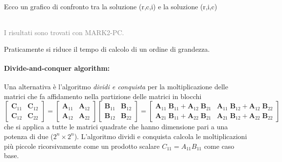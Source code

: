 \documentclass[10pt]{article}
\begin{document}
Ecco un grafico di confronto tra la soluzione (r,c,i) e la soluzione (r,i,c)

\\\textcolor{gray}{I risultati sono trovati con MARK2-PC.}

Praticamente si riduce il tempo di calcolo di un ordine di grandezza.






\paragraph{Divide-and-conquer algorithm:} Una alternativa è l'algoritmo \textit{dividi e conquista} per la moltiplicazione delle matrici che fa affidamento nella partizione delle matrici in blocchi
\begin{equation}
\begin{bmatrix}
\mathbf{C}_{11} & \mathbf{C}_{12} \\
\mathbf{C}_{12} & \mathbf{C}_{22}
\end{bmatrix} = 
\begin{bmatrix}
\mathbf{A}_{11} & \mathbf{A}_{12} \\
\mathbf{A}_{12} & \mathbf{A}_{22}
\end{bmatrix}
\begin{bmatrix}
\mathbf{B}_{11} & \mathbf{B}_{12} \\
\mathbf{B}_{12} & \mathbf{B}_{22}
\end{bmatrix} = 
\begin{bmatrix}
\mathbf{A}_{11}\;\mathbf{B}_{11}+\mathbf{A}_{12}\;\mathbf{B}_{21} & \mathbf{A}_{11}\;\mathbf{B}_{12}+\mathbf{A}_{12}\;\mathbf{B}_{22} \\
\mathbf{A}_{21}\;\mathbf{B}_{11}+\mathbf{A}_{22}\;\mathbf{B}_{21} & \mathbf{A}_{21}\;\mathbf{B}_{12}+\mathbf{A}_{22}\;\mathbf{B}_{22}
\end{bmatrix}
\end{equation}
che si applica a tutte le matrici quadrate che hanno dimensione pari a una potenza di due (${2^n \times 2^n}$).
L'algoritmo dividi e conquista calcola le moltiplicazioni più piccole ricorsivamente come un prodotto scalare $C_{11} = A_{11}B_{11}$ come caso base.
\end{document}
